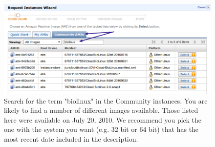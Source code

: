 \begin{figure}[!hd]
\includegraphics[width=\maxwidth]{"images/requestInstance"}
\caption[Start an Instance]{\label{fig:requestInstance}Search for the term "biolinux" in the Community instances. You are likely to find a number of different images available. Those listed here were available on July 20, 2010. We recommend you pick the one with the system you want (e.g. 32 bit or 64 bit) that has the most recent date included in the description.}
\end{figure}


